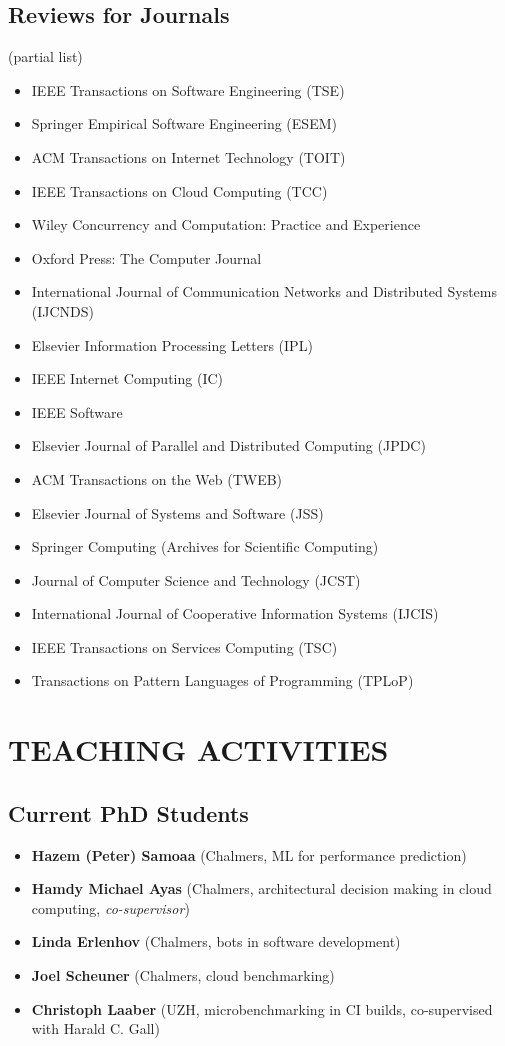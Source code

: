 \documentclass[paper=letter,fontsize=11pt]{scrartcl} %
\newcommand{\NewPart}[2]{\section*{\uppercase{#1} #2}}
\begin{document}
\subsection*{Reviews for Journals}

(partial list)

\begin{itemize}
\item IEEE Transactions on Software Engineering (TSE)
\item Springer Empirical Software Engineering (ESEM)
\item ACM Transactions on Internet Technology (TOIT)
\item IEEE Transactions on Cloud Computing (TCC)
\item Wiley Concurrency and Computation: Practice and Experience
\item Oxford Press: The Computer Journal
\item International Journal of Communication Networks and Distributed Systems (IJCNDS)
\item Elsevier Information Processing Letters (IPL)
\item IEEE Internet Computing (IC)
\item IEEE Software
\item Elsevier Journal of Parallel and Distributed Computing (JPDC)
\item ACM Transactions on the Web (TWEB)
\item Elsevier Journal of Systems and Software (JSS)
\item Springer Computing (Archives for Scientific Computing)
\item Journal of Computer Science and Technology (JCST)
\item International Journal of Cooperative Information Systems (IJCIS)
\item IEEE Transactions on Services Computing (TSC)
\item Transactions on Pattern Languages of Programming (TPLoP)
\end{itemize}


\NewPart{Teaching Activities}{}

  \subsection*{Current PhD Students}

\begin{itemize}
	\item \textbf{Hazem (Peter) Samoaa}  (Chalmers, ML for performance prediction)
	\item \textbf{Hamdy Michael Ayas}  (Chalmers, architectural decision making in cloud computing, \emph{co-supervisor})
	\item \textbf{Linda Erlenhov}  (Chalmers, bots in software development)
\item \textbf{Joel Scheuner}  (Chalmers, cloud benchmarking)
\item \textbf{Christoph Laaber} (UZH, microbenchmarking in CI builds, co-supervised with Harald C. Gall)
\end{itemize}
\end{document}

